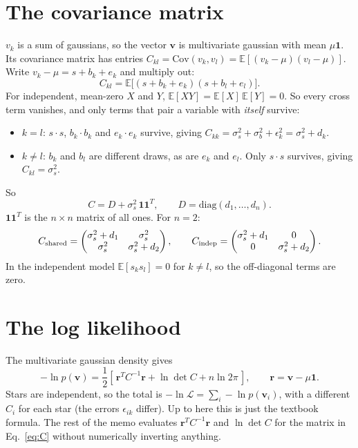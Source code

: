 \documentclass[11pt]{article}
\newcommand{\one}{\mathbf{1}}
\newcommand{\bv}{\mathbf{v}}
\newcommand{\br}{\mathbf{r}}
\newcommand{\E}{\mathbb{E}}
\newcommand{\Cov}{\mathrm{Cov}}
\begin{document}
\section{The covariance matrix}
$v_k$ is a sum of gaussians, so the vector $\bv$ is multivariate gaussian with mean $\mu\one$.
Its covariance matrix has entries $C_{kl} = \Cov(v_k, v_l) = \E[(v_k - \mu)(v_l - \mu)]$.
Write $v_k - \mu = s + b_k + e_k$ and multiply out:
\begin{equation}
  C_{kl} = \E\big[(s + b_k + e_k)(s + b_l + e_l)\big].
\end{equation}
For independent, mean-zero $X$ and $Y$, $\E[XY] = \E[X]\,\E[Y] = 0$.
So every cross term vanishes, and only terms that pair a variable with \emph{itself} survive:
\begin{itemize}
  \item $k = l$: $s\cdot s$, $b_k\cdot b_k$ and $e_k \cdot e_k$ survive, giving $C_{kk} = \sigma_s^2 + \sigma_b^2 + \epsilon_k^2 = \sigma_s^2 + d_k$.
  \item $k \neq l$: $b_k$ and $b_l$ are different draws, as are $e_k$ and $e_l$. Only $s\cdot s$ survives, giving $C_{kl} = \sigma_s^2$.
\end{itemize}
So
\begin{equation}
  C = D + \sigma_s^2\, \one\one^T, \qquad D = \mathrm{diag}(d_1, \dots, d_n).
  \label{eq:C}
\end{equation}
$\one\one^T$ is the $n\times n$ matrix of all ones.
For $n=2$:
\begin{equation}
  C_{\rm shared} = \begin{pmatrix} \sigma_s^2 + d_1 & \sigma_s^2 \\ \sigma_s^2 & \sigma_s^2 + d_2 \end{pmatrix},
  \qquad
  C_{\rm indep} = \begin{pmatrix} \sigma_s^2 + d_1 & 0 \\ 0 & \sigma_s^2 + d_2 \end{pmatrix}.
\end{equation}
In the independent model $\E[s_k s_l] = 0$ for $k \neq l$, so the off-diagonal terms are zero.

\section{The log likelihood}
The multivariate gaussian density gives
\begin{equation}
  -\ln p(\bv) = \frac{1}{2}\left[\, \br^T C^{-1} \br + \ln\det C + n \ln 2\pi \,\right],
  \qquad \br = \bv - \mu\one .
  \label{eq:mvn}
\end{equation}
Stars are independent, so the total is $-\ln\mathcal{L} = \sum_i -\ln p(\bv_i)$, with a different $C_i$ for each star
(the errors $\epsilon_{ik}$ differ).
Up to here this is just the textbook formula.
The rest of the memo evaluates $\br^T C^{-1}\br$ and $\ln\det C$ for the matrix in Eq.~\eqref{eq:C}
without numerically inverting anything.
\end{document}
